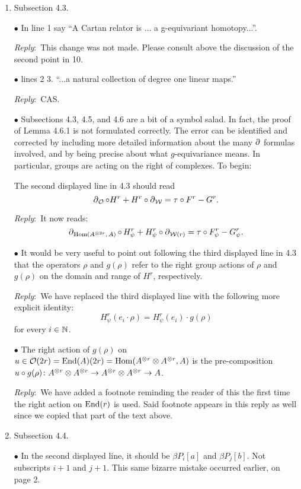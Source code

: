 \documentclass{amsart}
\newcommand{\ar}{\medskip\noindent\textit{Reply}:\ }
\def\subitem{\medskip\noindent$\bullet$ }
\begin{document}
\begin{enumerate}
	\item Subsection 4.3.

	\subitem In line 1 say “A Cartan relator is ... a g-equivariant homotopy...”.

	\ar This change was not made.
	Please consult above the discussion of the second point in 10.

	\subitem lines 2 3. “...a natural collection of degree one linear maps.”

	\ar CAS.

	\subitem Subsections 4.3, 4.5, and 4.6 are a bit of a symbol salad.
	In fact, the proof of Lemma	4.6.1 is not formulated correctly.
	The error can be identified and corrected by including more detailed information about the many $\operatorname{\partial}$ formulas involved, and by being precise about
	what $g$-equivariance means.
	In particular, groups are acting on the right of complexes.
	To begin:

	\medskip\noindent The second displayed line in 4.3 should read
	\[
	\operatorname{\partial}_{\mathcal{O}} \mathbin{\circ} H^r + H^r \mathbin{\circ} \operatorname{\partial}_{\mathcal{W}} = \tau \mathbin{\circ} F^r - G^r.
	\]

	\ar It now reads:
	\[
	\operatorname{\partial}_{\mathrm{Hom}(A^{\otimes 2r},\, A)} \mathbin{\circ} \,H^r_\psi + H^r_\psi \mathbin{\circ} \operatorname{\partial}_{\mathcal{W}(r)} = \tau \mathbin{\circ} F^r_\psi - G^r_\psi.
	\]

	\subitem It would be very useful to point out following the third displayed line in 4.3 that the operators $\rho$ and $g(\rho)$ refer to the right group actions of $\rho$ and $g(\rho)$ on the domain and range of $H^r$, respectively.

	\ar We have replaced the third displayed line with the following more explicit identity:
	\[
	H^r_\psi(e_i \cdot \rho) = H^r_\psi(e_i) \cdot g(\rho)
	\]
	for every $i \in \mathbb{N}$.

	\subitem The right action of $g(\rho)$ on $u \in \mathcal{O}(2r) = \mathrm{End}(A)(2r) = \mathrm{Hom}(A^{\otimes r} \otimes A^{\otimes r}, A)$ is the pre-composition $u \mathbin{\circ} g(\rho) \colon A^{\otimes r} \otimes A^{\otimes r} \to A^{\otimes r} \otimes A^{\otimes r} \to A$.

	\ar We have added a footnote reminding the reader of this the first time the right action on $\mathrm{End}(r)$ is used.
	Said footnote appears in this reply as well since we copied that part of the text above.

	\item Subsection 4.4.

	\subitem In the second displayed line, it should be $\beta P_i[a]$ and $\beta P_j[b]$.
	Not subscripts $i+1$ and $j+1$.
	This same bizarre mistake occurred earlier, on page 2.


\end{enumerate}
\end{document}
